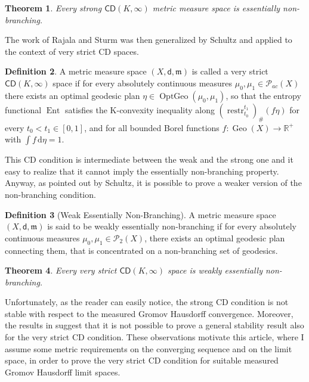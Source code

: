 \documentclass[11pt,twoside,a4paper]{article}
\newcommand{\setR}{\mathbb{R}}
\newcommand{\de}{\ensuremath{\, \mathrm d}} %
\newcommand{\CD}{\mathsf{CD}}
\DeclareMathOperator{\Ent}{Ent}
\DeclareMathOperator{\Geo}{Geo}
\DeclareMathOperator{\OptGeo}{OptGeo}
\newcommand{\Prob}{\mathscr{P}}
\newcommand{\ProbTwo}{\mathscr{P}_2}
\theoremstyle{theorem}
\newtheorem{theorem}{Theorem}[section]
\theoremstyle{definition}
\newtheorem{definition}[theorem]{Definition}
\theoremstyle{remark}
\theoremstyle{proof}
\begin{document}
\begin{theorem}\label{thm:RajalaSturm}
Every strong $\CD(K,\infty)$ metric measure space is essentially non-branching.
\end{theorem} 

\noindent The work of Rajala and Sturm was then generalized by Schultz \cite{schultz2017existence} and applied to the context of very strict CD spaces.

\begin{definition}\label{def:verystrict}
A metric measure space $(X,\mathsf{d},\mathfrak{m})$ is called a very strict $\CD(K,\infty)$ space
if for every absolutely continuous measures $\mu_0,\mu_1\in\Prob_{ac}(X)$
there exists an optimal geodesic plan $\eta\in\OptGeo(\mu_0,\mu_1)$, so that the entropy functional $\Ent$ satisfies the K-convexity inequality along $(\operatorname{restr}_{t_0}^{t_1})_\# (f\eta)$
for every $t_0<t_1\in [0,1]$, and for all bounded Borel functions $f : \Geo(X) \to \setR^+$ with $\int f \de \eta=1$.
\end{definition}

This CD condition is intermediate between the weak and the strong one and it easy to realize that it cannot imply the essentially non-branching property. Anyway, as pointed out by Schultz, it is possible to prove a weaker version of the non-branching condition. 

\begin{definition}[Weak Essentially Non-Branching]
A metric measure space $(X,\mathsf{d},\mathfrak{m})$ is said to be weakly essentially non-branching if for every absolutely continuous measures $\mu_0,\mu_1\in\ProbTwo(X)$, there exists an optimal geodesic plan connecting them, that is concentrated on a non-branching set of geodesics.
\end{definition}

\begin{theorem}\label{thm:schultz}
Every very strict $\CD(K,\infty)$ space is weakly essentially non-branching.
\end{theorem}

Unfortunately, as the reader can easily notice, the strong CD condition is not stable with respect to the measured Gromov Hausdorff convergence. Moreover, the results in \cite{MM-Example} suggest that it is not possible to prove a general stability result also for the very strict CD condition. These observations motivate this article, where I assume some metric requirements on the converging sequence and on the limit space, in order to prove the very strict CD condition for suitable measured Gromov Hausdorff limit spaces.
\end{document}
